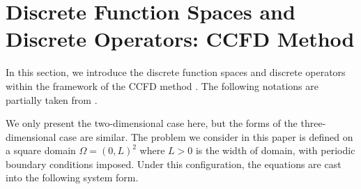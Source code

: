 \section{Discrete Function Spaces and Discrete Operators: CCFD Method}
\label{section:discrete}
In this section, we introduce the discrete function spaces and discrete operators within the framework of the CCFD method \cite{tryggvason2011direct}. 
The following notations are partially taken from \cite{chen2019positivity,li2025overcoming}.
\par We only present the two-dimensional case here, but the forms of the three-dimensional case are similar. 
The problem we consider in this paper is defined on a square domain $\Omega=(0,L)^2$ where $L>0$ is the width of domain, 
with periodic boundary conditions imposed. Under this configuration, the equations are cast into the following system form.

